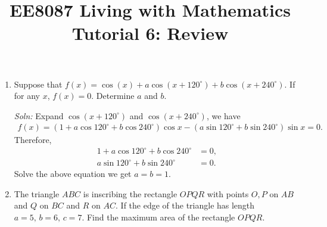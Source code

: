 \documentclass{article}
\title{EE8087 Living with Mathematics\\Tutorial 6: Review}
\date{}
\begin{document}
 \maketitle
\begin{enumerate}
\item Suppose that $f(x) = \cos(x)+a\cos(x+120^\circ)+b\cos(x+240^\circ)$. If for any $x$, $f(x) = 0$. Determine $a$ and $b$.

  \emph{Soln:} Expand $\cos (x+120^\circ)$ and $\cos(x+240^\circ)$, we have
  \begin{align*}
    f(x) = (1+a\cos 120^\circ + b \cos 240^\circ)\cos x - (a\sin 120^\circ + b \sin 240^\circ)\sin x = 0.
  \end{align*}
  Therefore,
  \begin{align*}
    1+a\cos 120^\circ + b \cos 240^\circ&= 0,\\
    a\sin 120^\circ + b \sin 240^\circ&= 0.
  \end{align*}
Solve the above equation we get $a = b = 1$.

\newpage
\item The triangle $ABC$ is inscribing the rectangle $OPQR$ with points $O,P$ on $AB$ and $Q$ on $BC$ and $R$ on $AC$. If the edge of the triangle has length $a = 5,\,b = 6,\, c = 7$. Find the maximum area of the rectangle $OPQR$.
  \begin{figure}[ht]
    \centering
  \end{figure}


\end{enumerate}
\end{document}
